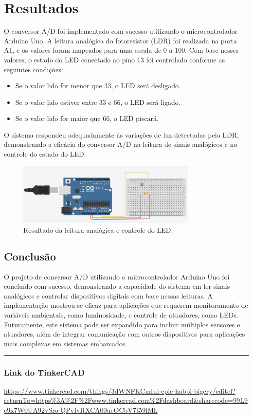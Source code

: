 \documentclass[12pt, a4paper]{article}
\begin{document}
\section{Resultados}
O conversor A/D foi implementado com sucesso utilizando o microcontrolador Arduino Uno. A leitura analógica do fotoresistor (LDR) foi realizada na porta A1, e os valores foram mapeados para uma escala de 0 a 100. Com base nesses valores, o estado do LED conectado ao pino 13 foi controlado conforme as seguintes condições:
\begin{itemize}
	\item Se o valor lido for menor que 33, o LED será desligado.
	\item Se o valor lido estiver entre 33 e 66, o LED será ligado.
	\item Se o valor lido for maior que 66, o LED piscará.
\end{itemize}
O sistema respondeu adequadamente às variações de luz detectadas pelo LDR, demonstrando a eficácia do conversor A/D na leitura de sinais analógicos e no controle do estado do LED.
\begin{figure}[H]
	\centering
	\includegraphics[width=0.8\textwidth]{montagem_aula04.png}
	\caption{Resultado da leitura analógica e controle do LED.}
	\label{fig:resultado_leitura}
\end{figure}

\newpage
\begin{center}
	\section{Conclusão}
\end{center}
O projeto de conversor A/D utilizando o microcontrolador Arduino Uno foi concluído com sucesso, demonstrando a capacidade do sistema em ler sinais analógicos e controlar dispositivos digitais com base nessas leituras. A implementação mostrou-se eficaz para aplicações que requerem monitoramento de variáveis ambientais, como luminosidade, e controle de atuadores, como LEDs. Futuramente, este sistema pode ser expandido para incluir múltiplos sensores e atuadores, além de integrar comunicação com outros dispositivos para aplicações mais complexas em sistemas embarcados.

\rule{\textwidth}{0.4pt}
\subsubsection{Link do TinkerCAD}
\url{https://www.tinkercad.com/things/3dWNFKCmIui-epic-habbi-bigery/editel?returnTo=https%3A%2F%2Fwww.tinkercad.com%2Fdashboard&sharecode=99L9c9x7W0UA92vSro-QPvIvRXCA00ueOCbV7t59lMk}
\end{document}
